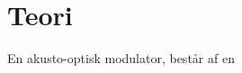 \documentclass[main]{subfiles}
\begin{document}
\section{Teori}
En akusto-optisk modulator, består af en 
\end{document}
